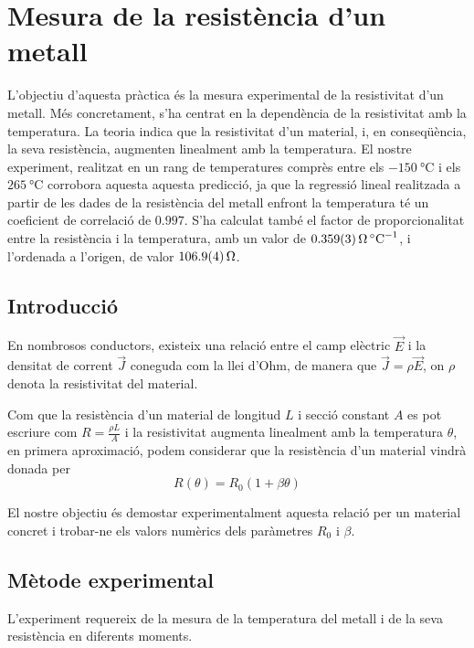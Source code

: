 \chapter{Mesura de la resistència d'un metall}
\begin{resum}
	L'objectiu d'aquesta pràctica és la mesura experimental de la resistivitat d'un metall. Més concretament, s'ha centrat en la dependència de la resistivitat amb la temperatura. La teoria indica que la resistivitat d'un material, i, en conseqüència, la seva resistència, augmenten linealment amb la temperatura. El nostre experiment, realitzat en un rang de temperatures comprès entre els $\SI{-150}{\celsius}$ i els $\SI{265}{\celsius}$ corrobora aquesta aquesta predicció, ja que la regressió lineal realitzada a partir de les dades de la resistència del metall enfront la temperatura té un coeficient de correlació de $0.997$. S'ha calculat també el factor de proporcionalitat entre la resistència i la temperatura, amb un valor de $\data{0.359}{0.003}{\ohm.\celsius^{-1}}$, i l'ordenada a l'origen, de valor $\data{106.9}{0.4}{\ohm}$.
\end{resum}

\section{Introducció}
En nombrosos conductors, existeix una relació entre el camp elèctric $\vec{E}$ i la densitat de corrent $\vec{J}$ coneguda com la llei d'Ohm, de manera que $\vec{J}=\rho\vec{E}$, on $\rho$ denota la resistivitat del material.

Com que la resistència d'un material de longitud $L$ i secció constant $A$ es pot escriure com $R=\frac{\rho L}{A}$ i la resistivitat augmenta linealment amb la temperatura \( \theta \), en primera aproximació, podem considerar que la resistència d'un material vindrà donada per 
\begin{equation} \label{eq:regressio}
R(\theta)=R_0(1+\beta\theta)
\end{equation}

El nostre objectiu és demostar experimentalment aquesta relació per un material concret i trobar-ne els valors numèrics dels paràmetres $R_0$ i $\beta$.

\section{Mètode experimental}
L'experiment requereix de la mesura de la temperatura del metall i de la seva resistència en diferents moments.

